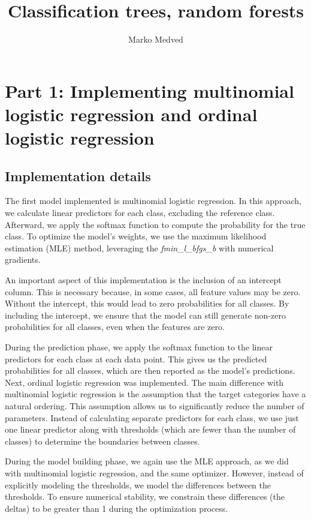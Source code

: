 \documentclass[9pt]{IEEEtran}
\title{\vspace{0ex}
Classification trees, random forests}
\author{Marko Medved\vspace{-4.0ex}}
\begin{document}
\maketitle

\section{Part 1: Implementing multinomial logistic regression and ordinal logistic regression }
\subsection{Implementation details}
The first model implemented is multinomial logistic regression. 
In this approach, we calculate linear predictors for each class, 
excluding the reference class. Afterward, we apply the softmax function
 to compute the probability for the true class. To optimize the model’s 
 weights, we use the maximum likelihood estimation (MLE) method, leveraging 
 the \textit{fmin\_l\_bfgs\_b} with numerical gradients.
 
An important aspect of this implementation is the inclusion of an 
intercept column. This is necessary because, in some cases, all feature 
values may be zero. Without the intercept, this would lead to zero
 probabilities for all classes. By including the intercept, we ensure 
 that the model can still generate non-zero probabilities for all classes,
  even when the features are zero.

During the prediction phase, we apply the softmax function to the
 linear predictors for each class at each data point. This gives us 
 the predicted probabilities for all classes, which are then reported as
  the model's predictions.  \\

  Next, ordinal logistic regression was implemented. The main difference
   with multinomial logistic regression is the assumption that the target 
   categories have a natural ordering. This assumption allows us to 
   significantly reduce the number of parameters. Instead of calculating
    separate predictors for each class, we use just one linear predictor 
    along with thresholds (which are fewer than the number of classes) to
     determine the boundaries between classes.

  During the model building phase, we again use the MLE approach, as we did with multinomial 
  logistic regression, and the same optimizer. However, instead of 
  explicitly modeling the thresholds, we model the differences between
   the thresholds. To ensure numerical stability, we constrain
    these differences (the deltas) to be greater than 1 during the
     optimization process.
  
\end{document}
